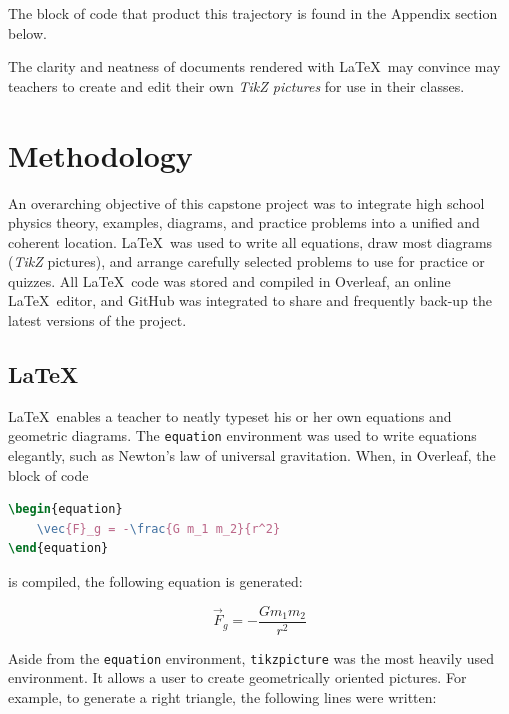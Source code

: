 \documentclass[12pt]{article}
\begin{document}
\noindent The block of code that product this trajectory is found in the Appendix section below.

The clarity and neatness of documents rendered with \LaTeX\ may convince may teachers to create and edit their own \textit{TikZ pictures} for use in their classes.





\clearpage


\section{Methodology}
An overarching objective of this capstone project was to integrate high school physics theory, examples, diagrams, and practice problems into a unified and coherent location. \LaTeX\ was used to write all equations, draw most diagrams (\textit{TikZ} pictures), and arrange carefully selected problems to use for practice or quizzes. All \LaTeX\ code was stored and compiled in Overleaf, an online \LaTeX\ editor, and GitHub was integrated to share and frequently back-up the latest versions of the project.

\subsection*{LaTeX}

\LaTeX\ enables a teacher to neatly typeset his or her own equations and geometric diagrams. The \texttt{equation} environment was used to write equations elegantly, such as Newton's law of universal gravitation. When, in Overleaf, the block of code

\begin{lstlisting}[language=TeX]
\begin{equation}
    \vec{F}_g = -\frac{G m_1 m_2}{r^2}
\end{equation}
\end{lstlisting}

\noindent is compiled, the following equation is generated:

\begin{equation}
    \vec{F}_g = -\frac{G m_1 m_2}{r^2}
\end{equation}

Aside from the \texttt{equation} environment, \texttt{tikzpicture} was the most heavily used environment. It allows a user to create geometrically oriented pictures. For example, to generate a right triangle, the following lines were written:
\end{document}
